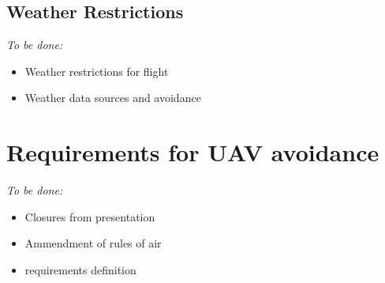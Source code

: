 \subsection{Weather Restrictions}
    \emph{To be done:}
    \begin{itemize}
        \item Weather restrictions for flight
        \item Weather data sources and avoidance
    \end{itemize} 

\section{Requirements for UAV avoidance}
    \emph{To be done:}
    \begin{itemize}
        \item Closures from presentation
        \item Ammendment of rules of air
        \item requirements definition
    \end{itemize} 





    


